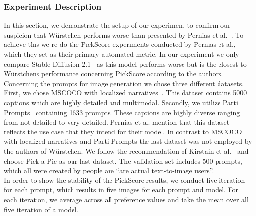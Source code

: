 \subsubsection{Experiment Description}
In this section, we demonstrate the setup of our experiment to confirm our
suspicion that W\"urstchen performs worse than presented by Pernias et
al.~\cite{pernias2024wrstchen}. To achieve this we re-do the PickScore
experiments conducted by Pernias et al., which they set as their primary
automated metric. In our experiment we only compare Stable Diffusion
2.1~\cite{rombach2023sd_2_1} as this model performs worse but is the closest to
W\"urstchens performance concerning PickScore according to the authors. \\

Concerning the prompts for image generation we chose three different datasets.
First, we chose MSCOCO with localized narratives~\cite{PontTuset2020LocalizedNarratives}.
This dataset contains 5000 captions which are highly detailed and multimodal.
Secondly, we utilize Parti Prompts~\cite{yu2022scalingautoregressivemodelscontentrich}
containing 1633 prompts. These captions are highly diverse ranging from
not-detailed to very detailed. Pernias et al. mention that this dataset reflects
the use case that they intend for their model. In contrast to MSCOCO with
localized narratives and Parti Prompts the last dataset was not employed by the
authors of W\"urstchen. We follow the recommendation of Kirstain et
al.~\cite{kirstain2023pickapic} and choose Pick-a-Pic as our last dataset. The
validation set includes 500 prompts, which all were created by people are
``are actual text-to-image users''\cite{kirstain2023pickapic}.\\

In order to show the stability of the PickScore results, we conduct five
iteration for each prompt, which results in five images for each prompt and
model. For each iteration, we average across all preference values and take the
mean over all five iteration of a model.

